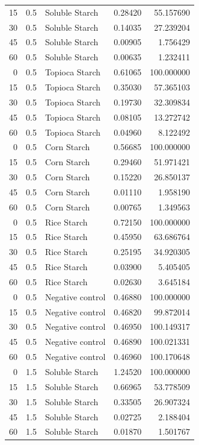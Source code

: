 \documentclass[
  12pt,
]{article}
\begin{document}
{\begin{longtable}[]{@{}rrlrr@{}}
15 & 0.5 & Soluble Starch & 0.28420 & 55.157690 \\
30 & 0.5 & Soluble Starch & 0.14035 & 27.239204 \\
45 & 0.5 & Soluble Starch & 0.00905 & 1.756429 \\
60 & 0.5 & Soluble Starch & 0.00635 & 1.232411 \\
0 & 0.5 & Topioca Starch & 0.61065 & 100.000000 \\
15 & 0.5 & Topioca Starch & 0.35030 & 57.365103 \\
30 & 0.5 & Topioca Starch & 0.19730 & 32.309834 \\
45 & 0.5 & Topioca Starch & 0.08105 & 13.272742 \\
60 & 0.5 & Topioca Starch & 0.04960 & 8.122492 \\
0 & 0.5 & Corn Starch & 0.56685 & 100.000000 \\
15 & 0.5 & Corn Starch & 0.29460 & 51.971421 \\
30 & 0.5 & Corn Starch & 0.15220 & 26.850137 \\
45 & 0.5 & Corn Starch & 0.01110 & 1.958190 \\
60 & 0.5 & Corn Starch & 0.00765 & 1.349563 \\
0 & 0.5 & Rice Starch & 0.72150 & 100.000000 \\
15 & 0.5 & Rice Starch & 0.45950 & 63.686764 \\
30 & 0.5 & Rice Starch & 0.25195 & 34.920305 \\
45 & 0.5 & Rice Starch & 0.03900 & 5.405405 \\
60 & 0.5 & Rice Starch & 0.02630 & 3.645184 \\
0 & 0.5 & Negative control & 0.46880 & 100.000000 \\
15 & 0.5 & Negative control & 0.46820 & 99.872014 \\
30 & 0.5 & Negative control & 0.46950 & 100.149317 \\
45 & 0.5 & Negative control & 0.46890 & 100.021331 \\
60 & 0.5 & Negative control & 0.46960 & 100.170648 \\
0 & 1.5 & Soluble Starch & 1.24520 & 100.000000 \\
15 & 1.5 & Soluble Starch & 0.66965 & 53.778509 \\
30 & 1.5 & Soluble Starch & 0.33505 & 26.907324 \\
45 & 1.5 & Soluble Starch & 0.02725 & 2.188404 \\
60 & 1.5 & Soluble Starch & 0.01870 & 1.501767 \\

\end{longtable}}
\end{document}
